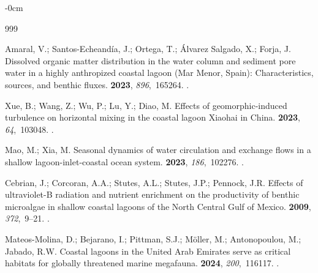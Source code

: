 \documentclass[jmse,article,accept,pdftex,oneauthor]{Definitions/mdpi}
\begin{document}
\begin{adjustwidth}{-\extralength}{0cm}
\begin{thebibliography}{999}

Amaral, V.; Santos-Echeandía, J.; Ortega, T.; Álvarez Salgado, X.; Forja, J.
\newblock Dissolved organic matter distribution in the water column and
  sediment pore water in a highly anthropized coastal lagoon (Mar Menor,
  Spain): Characteristics, sources, and benthic fluxes.
 {\bf 2023}, {\em 896},~165264.
.

Xue, B.; Wang, Z.; Wu, P.; Lu, Y.; Diao, M.
\newblock Effects of geomorphic-induced turbulence on horizontal mixing in the
  coastal lagoon Xiaohai in China.
 {\bf 2023}, {\em
  64},~103048.
.

Mao, M.; Xia, M.
\newblock Seasonal dynamics of water circulation and exchange flows in a
  shallow lagoon-inlet-coastal ocean system.
 {\bf 2023}, {\em 186},~102276.
.

Cebrian, J.; Corcoran, A.A.; Stutes, A.L.; Stutes, J.P.; Pennock, J.R.
\newblock Effects of ultraviolet-B radiation and nutrient enrichment on the
  productivity of benthic microalgae in shallow coastal lagoons of the North
  Central Gulf of Mexico.
 {\bf 2009},
  {\em 372},~9--21.
.

Mateos-Molina, D.; Bejarano, I.; Pittman, S.J.; Möller, M.; Antonopoulou, M.;
  Jabado, R.W.
\newblock Coastal lagoons in the United Arab Emirates serve as critical
  habitats for globally threatened marine megafauna.
 {\bf 2024}, {\em 200},~116117.
.


\end{thebibliography}
\end{adjustwidth}
\end{document}
